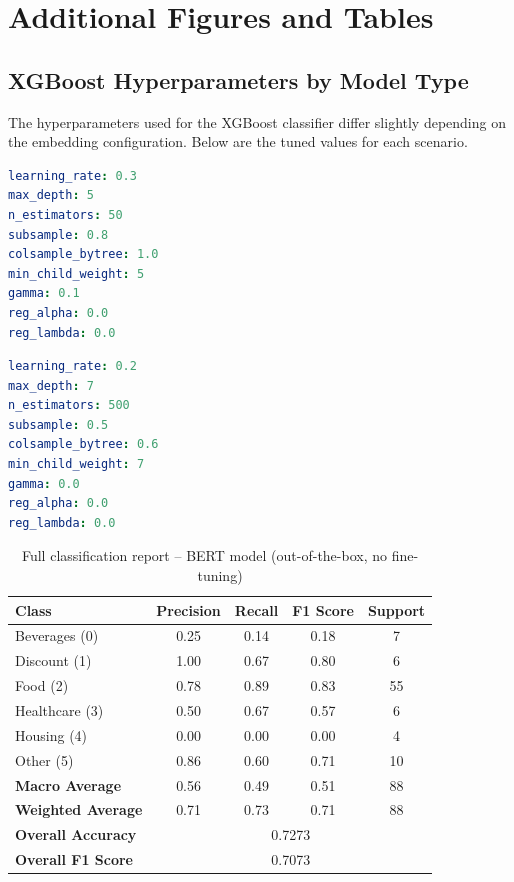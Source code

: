 \documentclass{SGGW-thesis-EN}
\begin{document}
\section{Additional Figures and Tables}
\subsection{XGBoost Hyperparameters by Model Type}

\noindent The hyperparameters used for the XGBoost classifier differ slightly depending on the embedding configuration.
Below are the tuned values for each scenario.

\begin{lstlisting}[language=yaml, caption={XGBoost hyperparameters – BERT model}, label={lst:bert_params}]
learning_rate: 0.3
max_depth: 5
n_estimators: 50
subsample: 0.8
colsample_bytree: 1.0
min_child_weight: 5
gamma: 0.1
reg_alpha: 0.0
reg_lambda: 0.0
\end{lstlisting}

\begin{lstlisting}[language=yaml, caption={XGBoost hyperparameters – Sentence-Transformer (GPT + real fine-tuned)}, label={lst:gpt_real_params}]
learning_rate: 0.2
max_depth: 7
n_estimators: 500
subsample: 0.5
colsample_bytree: 0.6
min_child_weight: 7
gamma: 0.0
reg_alpha: 0.0
reg_lambda: 0.0
\end{lstlisting}

\begin{table}
  \centering
  \caption{Full classification report – BERT model (out-of-the-box, no fine-tuning)}
  \label{appendix:bert-report-outofbox}
  \begin{tabularx}{\textwidth}{lcccc}
    \toprule
    \textbf{Class} & \textbf{Precision} & \textbf{Recall} & \textbf{F1 Score} & \textbf{Support} \\
    \midrule
    Beverages (0)     & 0.25 & 0.14 & 0.18 & 7 \\
    Discount (1)      & 1.00 & 0.67 & 0.80 & 6 \\
    Food (2)          & 0.78 & 0.89 & 0.83 & 55 \\
    Healthcare (3)    & 0.50 & 0.67 & 0.57 & 6 \\
    Housing (4)       & 0.00 & 0.00 & 0.00 & 4 \\
    Other (5)         & 0.86 & 0.60 & 0.71 & 10 \\
    \midrule
    \textbf{Macro Average}   & 0.56 & 0.49 & 0.51 & 88 \\
    \textbf{Weighted Average}& 0.71 & 0.73 & 0.71 & 88 \\
    \textbf{Overall Accuracy}& \multicolumn{4}{c}{0.7273} \\
    \textbf{Overall F1 Score}& \multicolumn{4}{c}{0.7073} \\
    \bottomrule
  \end{tabularx}
\end{table}

\beforelastpage
\end{document}
